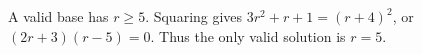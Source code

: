 A valid base has $ r\ge5 $. Squaring gives $ 3r^2+r+1=(r+4)^2 $, or $(2r+3)(r-5)=0 $. Thus the only valid solution is $\boxed{r=5}$.
